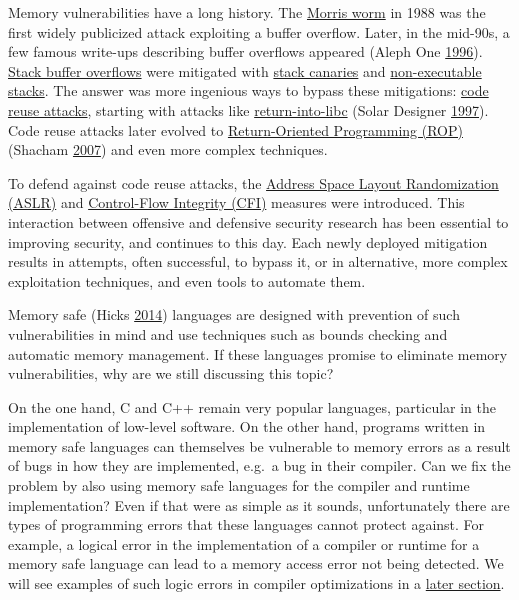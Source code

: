 \documentclass[a4paper,]{report}
\begin{document}
Memory vulnerabilities have a long history. The
\href{https://en.wikipedia.org/wiki/Morris_worm}{Morris worm} in 1988
was the first widely publicized attack exploiting a buffer overflow.
Later, in the mid-90s, a few famous write-ups describing buffer
overflows appeared (Aleph One
\protect\hyperlink{ref-AlephOne1996}{1996}).
\protect\hyperlink{stack-buffer-overflows}{Stack buffer overflows} were
mitigated with \protect\hyperlink{stack-buffer-overflows}{stack
canaries} and \protect\hyperlink{stack-buffer-overflows}{non-executable
stacks}. The answer was more ingenious ways to bypass these mitigations:
\protect\hyperlink{code-reuse-attacks}{code reuse attacks}, starting
with attacks like
\protect\hyperlink{code-reuse-attacks}{return-into-libc} (Solar Designer
\protect\hyperlink{ref-Solar1997}{1997}). Code reuse attacks later
evolved to
\protect\hyperlink{return-oriented-programming}{Return-Oriented
Programming (ROP)} (Shacham \protect\hyperlink{ref-Shacham2007}{2007})
and even more complex techniques.

To defend against code reuse attacks, the
\protect\hyperlink{aslr}{Address Space Layout Randomization (ASLR)} and
\protect\hyperlink{cfi}{Control-Flow Integrity (CFI)} measures were
introduced. This interaction between offensive and defensive security
research has been essential to improving security, and continues to this
day. Each newly deployed mitigation results in attempts, often
successful, to bypass it, or in alternative, more complex exploitation
techniques, and even tools to automate them.

Memory safe (Hicks \protect\hyperlink{ref-Hicks2014}{2014}) languages
are designed with prevention of such vulnerabilities in mind and use
techniques such as bounds checking and automatic memory management. If
these languages promise to eliminate memory vulnerabilities, why are we
still discussing this topic?

On the one hand, C and C++ remain very popular languages, particular in
the implementation of low-level software. On the other hand, programs
written in memory safe languages can themselves be vulnerable to memory
errors as a result of bugs in how they are implemented, e.g.~a bug in
their compiler. Can we fix the problem by also using memory safe
languages for the compiler and runtime implementation? Even if that were
as simple as it sounds, unfortunately there are types of programming
errors that these languages cannot protect against. For example, a
logical error in the implementation of a compiler or runtime for a
memory safe language can lead to a memory access error not being
detected. We will see examples of such logic errors in compiler
optimizations in a
\protect\hyperlink{jit-compiler-vulnerabilities}{later section}.
\end{document}
